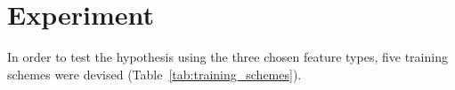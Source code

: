 \documentclass{sig-alternate-05-2015}
\begin{document}
	\section{Experiment} {
	\label{sec:experiment}

		In order to test the hypothesis using the three chosen feature types, five training schemes were devised (Table~\ref{tab:training_schemes}).






}
\end{document}

